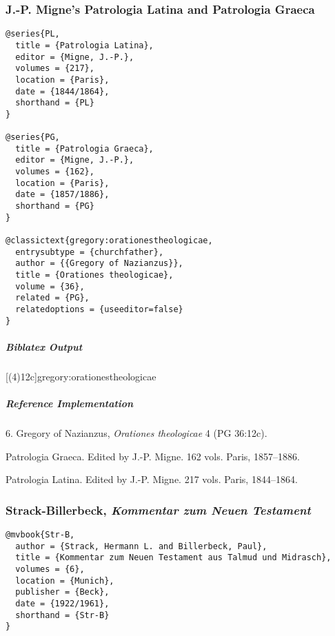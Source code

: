 \documentclass[a4paper]{article}
\newenvironment{biboutput}{%
  \subparagraph{Biblatex Output}
}{\color{black}}
\newenvironment{refimp}{%
  \subparagraph{Reference Implementation}
  \color{reference-colour}
  \rm
}{\par\color{black}}
\begin{document}
\subsubsection{J.-P. Migne's Patrologia Latina and Patrologia Graeca}

\begin{lstlisting}
@series{PL,
  title = {Patrologia Latina},
  editor = {Migne, J.-P.},
  volumes = {217},
  location = {Paris},
  date = {1844/1864},
  shorthand = {PL}
}

@series{PG,
  title = {Patrologia Graeca},
  editor = {Migne, J.-P.},
  volumes = {162},
  location = {Paris},
  date = {1857/1886},
  shorthand = {PG}
}

@classictext{gregory:orationestheologicae,
  entrysubtype = {churchfather},
  author = {{Gregory of Nazianzus}},
  title = {Orationes theologicae},
  volume = {36},
  related = {PG},
  relatedoptions = {useeditor=false}
}
\end{lstlisting}

\begin{biboutput}
  [(4)12c]{gregory:orationestheologicae}
\end{biboutput}

\begin{refimp}
  \hspace*{\bibindent}6. Gregory of Nazianzus, \emph{Orationes theologicae} 4
  (PG 36:12c).

  \hangindent\bibindent Patrologia Graeca. Edited by J.-P. Migne. 162 vols.
  Paris, 1857–1886.

  \hangindent\bibindent Patrologia Latina. Edited by J.-P. Migne. 217 vols.
  Paris, 1844–1864.


\end{refimp}

\subsubsection{Strack-Billerbeck, \emph{Kommentar zum Neuen Testament}}

\begin{lstlisting}
@mvbook{Str-B,
  author = {Strack, Hermann L. and Billerbeck, Paul},
  title = {Kommentar zum Neuen Testament aus Talmud und Midrasch},
  volumes = {6},
  location = {Munich},
  publisher = {Beck},
  date = {1922/1961},
  shorthand = {Str-B}
}
\end{lstlisting}
\end{document}
